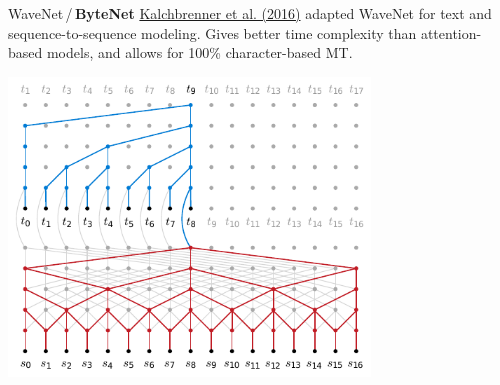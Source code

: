 \documentclass[xcolor=pdftex,x11names,table,hyperref]{beamer}
\begin{document}
\begin{frame}{WaveNet\,/\,\textbf{ByteNet}}
	\href{https://arxiv.org/abs/1610.10099}{Kalchbrenner et al. (2016)} adapted WaveNet for text and sequence-to-sequence modeling. Gives better time complexity than attention-based models, and allows for 100\% character-based MT. \\
	\begin{center}
	\includegraphics[width=0.72\textwidth]{images/bytenet.pdf}
	\end{center}
\end{frame}
\end{document}
